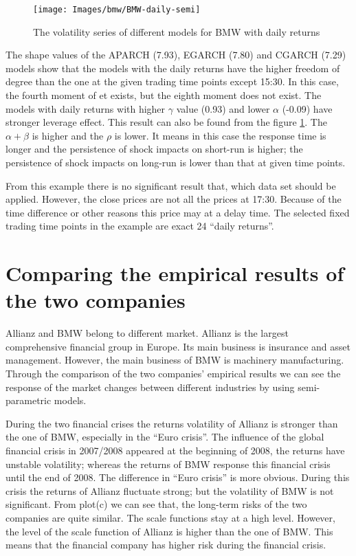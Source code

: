 \begin{figure}[!htbp]
	\centering
	\texttt{[image: Images/bmw/BMW-daily-semi]}
	\caption[The volatility series of different models for BMW with daily returns]{The volatility series of different models for BMW with daily returns}
	\label{fig:BMWdailysemi}
\end{figure}


The shape values of the APARCH (7.93), EGARCH (7.80) and CGARCH (7.29) models show that the models with the daily returns have the higher freedom of degree than the one at the given trading time points except 15:30. In this case, the fourth moment of et exists, but the eighth moment does not exist. The models with daily returns with higher $\gamma$ value (0.93) and lower $\alpha$ (-0.09) have stronger leverage effect. This result can also be found from the figure \ref{fig:BMWdailysemi}. The $\alpha + \beta$ is higher and the $\rho$ is lower. It means in this case the response time is longer and the persistence of shock impacts on short-run is higher; the persistence of shock impacts on long-run is lower than that at given time points.


From this example there is no significant result that, which data set should be applied. However, the close prices are not all the prices at 17:30. Because of the time difference or other reasons this price may at a delay time. The selected fixed trading time points in the example are exact 24 ``daily returns''.



\section{Comparing the empirical results of the two companies}

Allianz and BMW belong to different market. Allianz is the largest comprehensive financial group in Europe. Its main business is insurance and asset management. However, the main business of BMW is machinery manufacturing. Through the comparison of the two companies’ empirical results we can see the response of the market changes between different industries by using semi-parametric models.

During the two financial crises the returns volatility of Allianz is stronger than the one of BMW, especially in the ``Euro crisis''. The influence of the global financial crisis in 2007/2008 appeared at the beginning of 2008, the returns have unstable volatility; whereas the returns of BMW response this financial crisis until the end of 2008. The difference in ``Euro crisis'' is more obvious. During this crisis the returns of Allianz fluctuate strong; but the volatility of BMW is not significant. From plot(c) we can see that, the long-term risks of the two companies are quite similar. The scale functions stay at a high level. However, the level of the scale function of Allianz is higher than the one of BMW. This means that the financial company has higher risk during the financial crisis.

